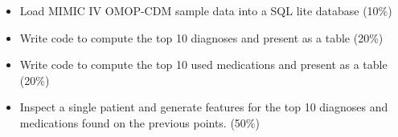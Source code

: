 \documentclass[
]{article}
\providecommand{\tightlist}{%
  \setlength{\itemsep}{0pt}\setlength{\parskip}{0pt}}
\begin{document}
\begin{itemize}
\tightlist
\item
  Load MIMIC IV OMOP-CDM sample data into a SQL lite database (10\%)
\item
  Write code to compute the top 10 diagnoses and present as a table
  (20\%)
\item
  Write code to compute the top 10 used medications and present as a
  table (20\%)
\item
  Inspect a single patient and generate features for the top 10
  diagnoses and medications found on the previous points. (50\%)
\end{itemize}
\end{document}
